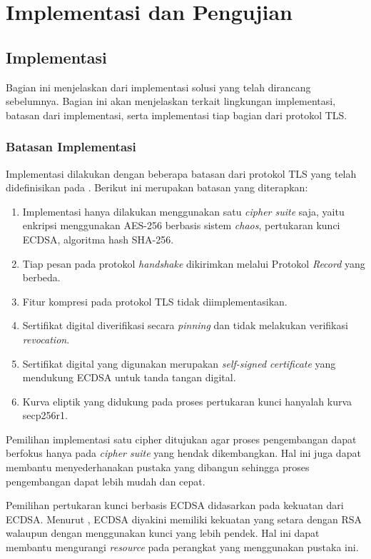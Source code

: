 \chapter{Implementasi dan Pengujian}

\section{Implementasi}

Bagian ini menjelaskan dari implementasi solusi yang telah dirancang sebelumnya. Bagian ini akan menjelaskan terkait lingkungan implementasi, batasan dari implementasi, serta implementasi tiap bagian dari protokol TLS.

\subsection{Batasan Implementasi}
Implementasi dilakukan dengan beberapa batasan dari protokol TLS yang telah didefinisikan pada \textcite{rfc5246}. Berikut ini merupakan batasan yang diterapkan:

\begin{enumerate}
  \item Implementasi hanya dilakukan menggunakan satu \emph{cipher suite} saja, yaitu enkripsi menggunakan AES-256 berbasis sistem \emph{chaos}, pertukaran kunci ECDSA, algoritma hash SHA-256.
  \item Tiap pesan pada protokol \emph{handshake} dikirimkan melalui Protokol \emph{Record} yang berbeda.
  \item Fitur kompresi pada protokol TLS tidak diimplementasikan.
  \item Sertifikat digital diverifikasi secara \emph{pinning} dan tidak melakukan verifikasi \emph{revocation}.
  \item Sertifikat digital yang digunakan merupakan \emph{self-signed certificate} yang mendukung ECDSA untuk tanda tangan digital.
  \item Kurva eliptik yang didukung pada proses pertukaran kunci hanyalah kurva secp256r1.
\end{enumerate}
  
Pemilihan implementasi satu cipher ditujukan agar proses pengembangan dapat berfokus hanya pada \emph{cipher suite} yang hendak dikembangkan. Hal ini juga dapat membantu menyederhanakan pustaka yang dibangun sehingga proses pengembangan dapat lebih mudah dan cepat. 

Pemilihan pertukaran kunci berbasis ECDSA didasarkan pada kekuatan dari ECDSA. Menurut \textcite{munir2019}, ECDSA diyakini memiliki kekuatan yang setara dengan RSA walaupun dengan menggunakan kunci yang lebih pendek. Hal ini dapat membantu mengurangi \emph{resource} pada perangkat yang menggunakan pustaka ini.


